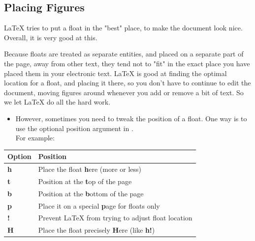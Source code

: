 \documentclass[usenames,dvipsnames]{beamer}
\begin{document}
\subsection[fragile]{Placing Figures}
\begin{frame}{\insertsubsection}

\LaTeX{} tries to put a float in the "best" place, to make the document look nice. Overall, it is very good at this. 
\medskip

Because floats are treated as separate entities, and placed on a separate part of the page, away from other text, they tend not to "fit" in the exact place you have placed them in your electronic text. \LaTeX{} is good at finding the optimal location for a float, and placing it there, so you don't have to continue to edit the document, moving figures around whenever you add or remove a bit of text. So we let \LaTeX{} do all the hard work.

\end{frame}
\begin{frame}
\begin{itemize}

\item However, sometimes you need to tweak the position of a float. One way is to use the optional position argument in . \\ For example: 
\end{itemize}
\medskip
\begin{tabular}{ll}

Option & Position \\ \hline
\textbf{h}  & Place the float \textbf{h}ere (more or less) \\
\textbf{t}   & Position at the \textbf{t}op of the page \\
\textbf{b}   & Position at the \textbf{b}ottom of the page \\
\textbf{p}   & Place it on a special \textbf{p}age for floats only \\
\textbf{!}    &Prevent  \LaTeX{} from trying to adjust float location\\
\textbf{H}    & Place the float precisely \textbf{H}ere (like \textbf{h!}) \\
\end{tabular}

\end{frame}
\end{document}
